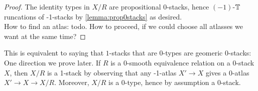 \documentclass{article}
\newcommand{\truncation}{$\bT$runcation}
\begin{document}
\begin{proof}
The identity types in $X / R$ are propositional  0-stacks, hence $(-1)$-\truncation s of  -1-stacks by \ref{lemma:prop0stacks} as desired. \\
How to find an atlas: todo. How to proceed, if we could choose all atlasses we want at the same time?

    
\end{proof}
\begin{rmk}
    This is equivalent to saying that  $1$-stacks that are $0$-types are geomeric $0$-stacks: One direction we prove later. If $R$ is a 0-smooth equivalence relation on a  0-stack $X$, then $ X/ R$ is a  1-stack by observing that any -1-atlas $X' \to X$ gives a 0-atlas $X' \to X \to X/ R$. Moreover, $ X/ R$ is a 0-type, hence by assumption a  0-stack.
\end{rmk}
\end{document}

